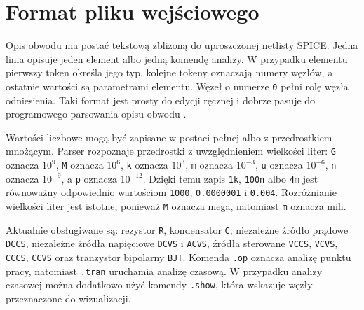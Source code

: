 \section{Format pliku wejściowego}
\label{sec:format-wejsciowy}

Opis obwodu ma postać tekstową zbliżoną do uproszczonej netlisty SPICE. Jedna linia opisuje jeden element albo jedną komendę analizy. W przypadku elementu pierwszy token określa jego typ, kolejne tokeny oznaczają numery węzłów, a ostatnie wartości są parametrami elementu. Węzeł o numerze \texttt{0} pełni rolę węzła odniesienia. Taki format jest prosty do edycji ręcznej i dobrze pasuje do programowego parsowania opisu obwodu \cite{nagel1975spice2,kundert1995designer}.

Wartości liczbowe mogą być zapisane w postaci pełnej albo z przedrostkiem mnożącym. Parser rozpoznaje przedrostki z uwzględnieniem wielkości liter: \texttt{G} oznacza \(10^9\), \texttt{M} oznacza \(10^6\), \texttt{k} oznacza \(10^3\), \texttt{m} oznacza \(10^{-3}\), \texttt{u} oznacza \(10^{-6}\), \texttt{n} oznacza \(10^{-9}\), a \texttt{p} oznacza \(10^{-12}\). Dzięki temu zapis \texttt{1k}, \texttt{100n} albo \texttt{4m} jest równoważny odpowiednio wartościom \texttt{1000}, \texttt{0.0000001} i \texttt{0.004}. Rozróżnianie wielkości liter jest istotne, ponieważ \texttt{M} oznacza mega, natomiast \texttt{m} oznacza mili.

Aktualnie obsługiwane są: rezystor \texttt{R}, kondensator \texttt{C}, niezależne źródło prądowe \texttt{DCCS}, niezależne źródła napięciowe \texttt{DCVS} i \texttt{ACVS}, źródła sterowane \texttt{VCCS}, \texttt{VCVS}, \texttt{CCCS}, \texttt{CCVS} oraz tranzystor bipolarny \texttt{BJT}. Komenda \texttt{.op} oznacza analizę punktu pracy, natomiast \texttt{.tran} uruchamia analizę czasową. W przypadku analizy czasowej można dodatkowo użyć komendy \texttt{.show}, która wskazuje węzły przeznaczone do wizualizacji.

